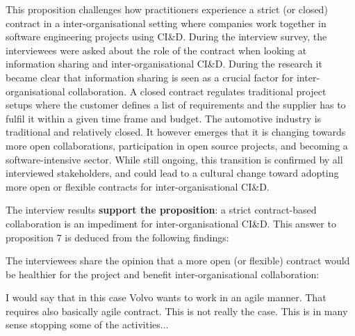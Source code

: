 This proposition challenges how practitioners experience a strict (or closed) contract in a inter-organisational setting where companies work together in software engineering projects using CI\&D. During the interview survey, the interviewees were asked about the role of the contract when looking at information sharing and inter-organisational CI\&D. During the research it became clear that information sharing is seen as a crucial factor for inter-organisational collaboration. A closed contract regulates traditional project setups where the customer defines a list of requirements and the supplier has to fulfil it within a given time frame and budget. The automotive industry is traditional and relatively closed. It however emerges that it is changing towards more open collaborations, %
participation in open source projects, and becoming a software-intensive sector. While still ongoing, this transition is confirmed by all interviewed stakeholders, and could lead to a cultural change toward adopting more open or flexible contracts for inter-organisational CI\&D.

The interview results {\bf support the proposition}: a strict contract-based collaboration is an impediment for inter-organisational CI\&D. This answer to proposition 7 is deduced from the following findings:


 The interviewees share the opinion that a more open (or flexible) contract would be healthier for the project and benefit inter-organisational collaboration: 

\begin{aquote}
I would say that in this case Volvo wants to work in an agile manner. That requires also basically agile contract. This is not really the case. This is in many sense stopping some of the activities...
\end{aquote}
%
%
%


